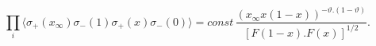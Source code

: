 \begin{equation}
\prod_i \langle \sigma _{+}(x_{\infty })\sigma _{-}(1)\sigma _{+}(x)\sigma
_{-}(0)\rangle =const\, \frac{(x_{\infty }x(1-x))^{-\vartheta .(1-\vartheta
    )}}{[F(1-x).F(x)]^{1/2}}.
\end{equation}

